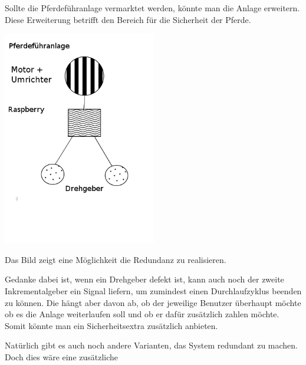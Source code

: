 \documentclass[12pt]{scrreprt} %
\begin{document}
Sollte die Pferdeführanlage vermarktet werden, könnte man die Anlage erweitern. Diese Erweiterung betrifft den Bereich für die Sicherheit der Pferde.

\begin{center}
	\includegraphics[width=0.5\textwidth]{Redundanz}
\end{center}

Das Bild zeigt eine Möglichkeit die Redundanz zu realisieren.

Gedanke dabei ist, wenn ein Drehgeber defekt ist, kann auch noch der zweite Inkrementalgeber ein Signal liefern, um zumindest einen Durchlaufzyklus beenden zu können. Die hängt aber davon ab, ob der jeweilige Benutzer überhaupt möchte ob es die Anlage weiterlaufen soll und ob er dafür zusätzlich zahlen möchte. Somit könnte man ein Sicherheitsextra zusätzlich anbieten.

Natürlich gibt es auch noch andere Varianten, das System redundant zu machen. Doch dies wäre eine zusätzliche 
\end{document}
